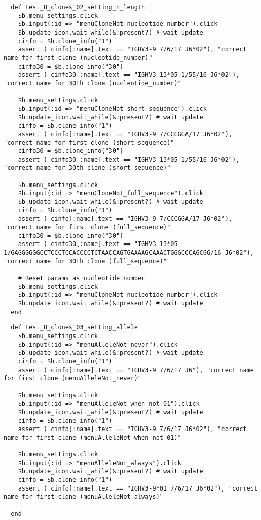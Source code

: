 \begin{verbatim}
  def test_B_clones_02_setting_n_length
    $b.menu_settings.click
    $b.input(:id => "menuCloneNot_nucleotide_number").click
    $b.update_icon.wait_while(&:present?) # wait update
    cinfo = $b.clone_info("1")
    assert ( cinfo[:name].text == "IGHV3-9 7/6/17 J6*02"), "correct name for first clone (nucleotide_number)"
    cinfo30 = $b.clone_info("30")
    assert ( cinfo30[:name].text == "IGHV3-13*05 1/55/16 J6*02"), "correct name for 30th clone (nucleotide_number)"

    $b.menu_settings.click
    $b.input(:id => "menuCloneNot_short_sequence").click
    $b.update_icon.wait_while(&:present?) # wait update
    cinfo = $b.clone_info("1")
    assert ( cinfo[:name].text == "IGHV3-9 7/CCCGGA/17 J6*02"), "correct name for first clone (short_sequence)"
    cinfo30 = $b.clone_info("30")
    assert ( cinfo30[:name].text == "IGHV3-13*05 1/55/16 J6*02"), "correct name for 30th clone (short_sequence)"

    $b.menu_settings.click
    $b.input(:id => "menuCloneNot_full_sequence").click
    $b.update_icon.wait_while(&:present?) # wait update
    cinfo = $b.clone_info("1")
    assert ( cinfo[:name].text == "IGHV3-9 7/CCCGGA/17 J6*02"), "correct name for first clone (full_sequence)"
    cinfo30 = $b.clone_info("30")
    assert ( cinfo30[:name].text == "IGHV3-13*05 1/GAGGGGGGCCTCCCTCCACCCCTCTAACCAGTGAAAAGCAAACTGGGCCCAGCGG/16 J6*02"), "correct name for 30th clone (full_sequence)"

    # Reset params as nucleotide number
    $b.menu_settings.click
    $b.input(:id => "menuCloneNot_nucleotide_number").click
    $b.update_icon.wait_while(&:present?) # wait update
  end
\end{verbatim}



\begin{verbatim}
  def test_B_clones_03_setting_allele
    $b.menu_settings.click
    $b.input(:id => "menuAlleleNot_never").click
    $b.update_icon.wait_while(&:present?) # wait update
    cinfo = $b.clone_info("1")
    assert ( cinfo[:name].text == "IGHV3-9 7/6/17 J6"), "correct name for first clone (menuAlleleNot_never)"

    $b.menu_settings.click
    $b.input(:id => "menuAlleleNot_when_not_01").click
    $b.update_icon.wait_while(&:present?) # wait update
    cinfo = $b.clone_info("1")
    assert ( cinfo[:name].text == "IGHV3-9 7/6/17 J6*02"), "correct name for first clone (menuAlleleNot_when_not_01)"

    $b.menu_settings.click
    $b.input(:id => "menuAlleleNot_always").click
    $b.update_icon.wait_while(&:present?) # wait update
    cinfo = $b.clone_info("1")
    assert ( cinfo[:name].text == "IGHV3-9*01 7/6/17 J6*02"), "correct name for first clone (menuAlleleNot_always)"

  end
\end{verbatim}

